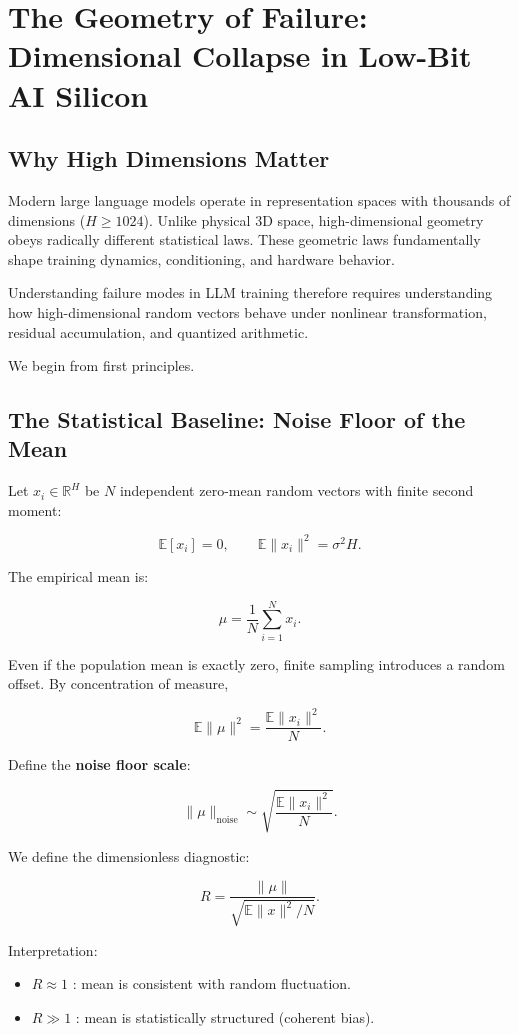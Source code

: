 \chapter{The Geometry of Failure: Dimensional Collapse in Low-Bit AI Silicon}

\section{Why High Dimensions Matter}

Modern large language models operate in representation spaces with thousands of
dimensions ($H \ge 1024$).
Unlike physical 3D space, high-dimensional geometry obeys radically different
statistical laws.
These geometric laws fundamentally shape training dynamics, conditioning,
and hardware behavior.

Understanding failure modes in LLM training therefore requires understanding
how high-dimensional random vectors behave under nonlinear transformation,
residual accumulation, and quantized arithmetic.

We begin from first principles.

\section{The Statistical Baseline: Noise Floor of the Mean}

Let $x_i \in \mathbb{R}^H$ be $N$ independent zero-mean random vectors with
finite second moment:

\[
\mathbb{E}[x_i] = 0, 
\qquad
\mathbb{E}\|x_i\|^2 = \sigma^2 H.
\]

The empirical mean is:

\[
\mu = \frac{1}{N} \sum_{i=1}^N x_i.
\]

Even if the population mean is exactly zero, finite sampling introduces
a random offset. By concentration of measure,

\[
\mathbb{E}\|\mu\|^2 = \frac{\mathbb{E}\|x_i\|^2}{N}.
\]

Define the \textbf{noise floor scale}:

\[
\|\mu\|_{\text{noise}} 
\sim \sqrt{\frac{\mathbb{E}\|x_i\|^2}{N}}.
\]

We define the dimensionless diagnostic:

\[
R = \frac{\|\mu\|}{\sqrt{\mathbb{E}\|x\|^2 / N}}.
\]

Interpretation:

\begin{itemize}
\item $R \approx 1$ : mean is consistent with random fluctuation.
\item $R \gg 1$ : mean is statistically structured (coherent bias).
\end{itemize}

